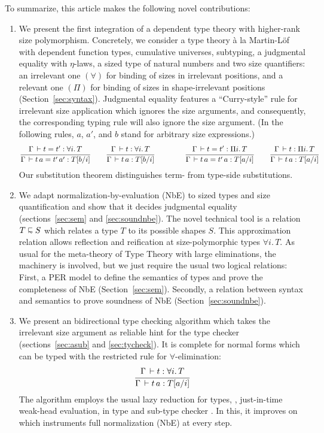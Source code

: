 \documentclass[acmsmall,screen]{acmart}\settopmatter{}
\begin{document}
To summarize, this article makes the following novel contributions:
\begin{enumerate}

\item We present the first integration of a dependent type theory with higher-rank size polymorphism.
Concretely, we consider a type theory \`a la Martin-L\"of with dependent function types, cumulative universes, subtyping, a judgmental equality with $\eta$-laws, a sized type of natural numbers and two size quantifiers: an irrelevant one $(\forall)$ for binding of sizes in irrelevant positions, and a relevant one $(\Pi)$ for binding of sizes in shape-irrelevant positions (Section~\ref{sec:syntax}).  Judgmental equality features a ``Curry-style'' rule for irrelevant size application which ignores the size arguments, and consequently, the corresponding typing rule will also ignore the size argument.
(In the following rules, $a$, $a'$, and $b$ stand for arbitrary size expressions.)
\[
\ru{\Gamma \der t = t' : \forall i.\, T
  }{\Gamma \der t\,a = t'\,a' : T[b/i]}
\qquad
\ru{\Gamma \der t : \forall i.\, T
  }{\Gamma \der t\,a : T[b/i]}
\qquad
\qquad
\ru{\Gamma \der t = t' : \Pi i.\, T
  }{\Gamma \der t\,a = t'\,a : T[a/i]}
\qquad
\ru{\Gamma \der t : \Pi i.\, T
  }{\Gamma \der t\,a : T[a/i]}
\]
Our substitution theorem distinguishes term- from type-side substitutions.

\item We adapt normalization-by-evaluation (NbE) to sized types and size quantification and show that it decides judgmental equality (sections~\ref{sec:sem} and \ref{sec:soundnbe}).  The novel technical tool is a relation $T \shape S$ which relates a type $T$ to its possible shapes $S$.  This approximation relation allows reflection and reification at size-polymorphic types $\forall i.\, T$.
As usual for the meta-theory of Type Theory with large eliminations, the machinery is involved, but we just require the usual two logical relations:  First, a PER model to define the semantics of types and prove the completeness of NbE (Section~\ref{sec:sem}).  Secondly, a relation between syntax and semantics to prove soundness of NbE (Section~\ref{sec:soundnbe}).

\item We present an bidirectional type checking algorithm \cite{coquand:type} which takes the irrelevant size argument as reliable hint for the type checker (sections~\ref{sec:asub} and \ref{sec:tycheck}).  It is complete for normal forms which can be typed with the restricted rule for $\forall$-elimination:
\[
\ru{\Gamma \der t : \forall i.\, T
  }{\Gamma \der t\,a : T[a/i]}
\]
The algorithm employs the usual lazy reduction for types, \ie, just-in-time weak-head evaluation, in type and sub-type checker
\cite{huet:wsscs89}.  In this, it improves on \citet{fridlenderPagano:tlca13} which instruments full normalization (NbE) at every step.
\end{enumerate}
\end{document}
